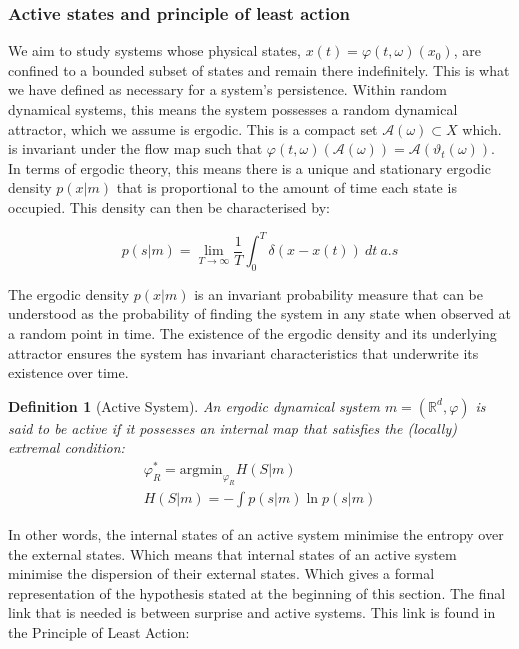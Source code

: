 \documentclass{article}
\newcommand{\R}{\mathbb{R}}
\newtheorem{definition}{Definition}
\begin{document}
\subsubsection{Active states and principle of least action}

We aim to study systems whose physical states, $x(t) = \varphi(t, \omega)(x_0)$, are confined to a bounded subset of states and remain there indefinitely. This is what we have defined as necessary for a system's persistence. Within random dynamical systems, this means the system possesses a random dynamical attractor, which we assume is ergodic. This is a compact set $\mathcal{A}(\omega) \subset X$ which. is invariant under the flow map such that  $\varphi(t, \omega)(\mathcal{A}(\omega)) = \mathcal{A}(\vartheta_t(\omega))$. In terms of ergodic theory, this means there is a unique and stationary ergodic density $p(x | m)$ that is proportional to the amount of time each state is occupied. This density can then be characterised by:

\begin{equation}\label{eq:ergodic_density}
	p(s | m ) = \lim_{T \to \infty} \frac{1}{T} \int^T_0 \delta( x - x(t)) \ dt \ a.s
\end{equation}

The ergodic density $p(x | m)$ is an invariant probability measure that can be understood as the  probability of finding the system in any state when observed at a random point in time. The existence of the ergodic density and its underlying attractor ensures the system has invariant characteristics that underwrite its existence over time. 


\begin{definition}[Active System]\label{def:active_system}
	An ergodic dynamical system $m = (\R^d, \varphi)$ is said to be active if it possesses an internal map that satisfies the (locally) extremal condition:
	\begin{equation*}
	\begin{aligned}
		\varphi_R^*= \text{argmin}_{\varphi_R} H(S | m) \\
		H(S | m) = - \int p(s | m)\ln p(s | m)
	\end{aligned}
	\end{equation*}
\end{definition}

In other words, the internal states of an active system minimise the entropy over the external states. Which means that internal states of an active system minimise the dispersion of their external states. Which gives a formal representation of the hypothesis stated at the beginning of this section. The final link that is needed is between surprise and active systems. This link is found in the Principle of Least Action:
\end{document}
